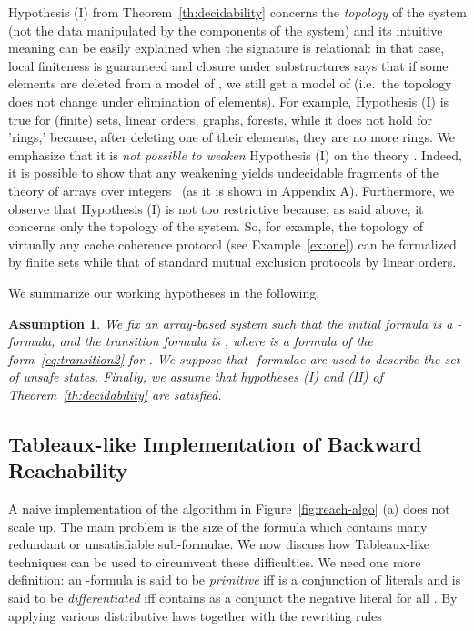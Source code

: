 \documentclass{LMCS}
\theoremstyle{plain}\newtheorem{assumption}[thm]{Assumption}
\theoremstyle{plain}\newtheorem{proposition}[thm]{Proposition}
\theoremstyle{plain}\newtheorem{property}[thm]{Property}
\theoremstyle{plain}\newtheorem{example}[thm]{Example}
\theoremstyle{plain}\newtheorem{claim}[thm]{Claim}
\theoremstyle{plain}\newtheorem{lemma}[thm]{Lemma}
\begin{document}
Hypothesis (I) from Theorem~\ref{th:decidability} concerns the
\emph{topology} of the system (not the data manipulated by the
components of the system)
and its intuitive meaning can be easily explained when the signature
 is relational: in that case, local finiteness is guaranteed
and closure under substructures says that if some elements are deleted
from a model of , we still get a model of  (i.e.\ the
topology does not change under elimination of elements).  For example,
Hypothesis (I) is true for (finite) sets, linear orders, graphs,
forests, while it does not hold for 'rings,' because, after deleting
one of their elements, they are no more rings.
We emphasize that it is \emph{not possible to weaken} Hypothesis (I)
on the theory .  Indeed, it is possible to show that any
weakening yields undecidable fragments of the theory of arrays over
integers~\cite{arrays} (as it is shown in Appendix A).  Furthermore,
we observe that Hypothesis (I) is not too restrictive because, as said
above, it concerns only the topology of the system.
So, for example, the topology of virtually any cache coherence
protocol (see Example~\ref{ex:one}) can be formalized by finite sets
while that of
standard mutual exclusion protocols by linear orders.





We summarize our working hypotheses in the following.
\begin{assumption}
  We fix an array-based system  such that the initial
  formula  is a -formula, and the transition formula
   is , where  is a
  formula
of the form~\eqref{eq:transition2} for .
We suppose that  -formulae are used to describe the set of
  unsafe states.
Finally, we assume that hypotheses (I) and (II) of
  Theorem~\ref{th:decidability} are satisfied.\end{assumption}




\subsection{Tableaux-like Implementation of Backward Reachability}
\label{subsec:tab}



A naive implementation of the algorithm in Figure~\ref{fig:reach-algo}
(a) does not scale up.  The main problem is the size of the formula
 which contains many redundant or unsatisfiable
sub-formulae.  We now discuss how Tableaux-like techniques can be used
to circumvent these difficulties.  We need one more definition: an
-formula  is said to be
\emph{primitive} iff  is a conjunction of literals and is said
to be \emph{differentiated} iff  contains as a conjunct the
negative literal  for all . By applying
various distributive laws together with the rewriting rules
\end{document}

